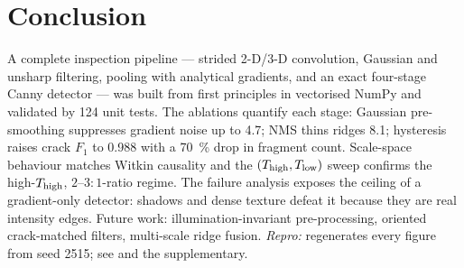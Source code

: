 \section{Conclusion}
\label{sec:conclusion}

A complete inspection pipeline --- strided 2-D/3-D convolution, Gaussian and
unsharp filtering, pooling with analytical gradients, and an exact four-stage
Canny detector --- was built from first principles in vectorised NumPy and
validated by \num{124} unit tests. The ablations quantify each stage: Gaussian
pre-smoothing suppresses gradient noise up to \SI{4.7}{\times}; NMS thins ridges
\SI{8.1}{\times}; hysteresis raises crack $F_1$ to \num{0.988} with a
\SI{70}{\percent} drop in fragment count. Scale-space behaviour matches Witkin
causality and the $(T_{\text{high}},T_{\text{low}})$ sweep confirms the high-$T_{\text{high}}$,
$2$--$3\!:\!1$-ratio regime. The failure analysis exposes the ceiling of a
gradient-only detector: shadows and dense texture defeat it because they are
real intensity edges. Future work: illumination-invariant pre-processing,
oriented crack-matched filters, multi-scale ridge fusion. \emph{Repro:}
 regenerates every figure from seed \num{2515};
see  and the supplementary.
